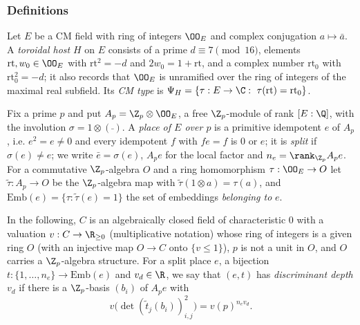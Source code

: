 \subsubsection{Definitions}
\begin{definition}\label{pf:sh-local:def:torhost}
Let $E$ be a CM field with ring of integers $\OO_E$ and complex conjugation $a\mapsto\bar a$. A \emph{toroidal host}
$H$ on $E$ consists of a prime $d\equiv7\pmod{16}$, elements $\mathrm{rt},w_0\in\OO_E$ with $\mathrm{rt}^2=-d$ and
$2w_0=1+\mathrm{rt}$, and a complex number $\mathrm{rt}_0$ with $\mathrm{rt}_0^2=-d$; it also records that $\OO_E$ is
unramified over the ring of integers of the maximal real subfield. Its \emph{CM type} is
$\Psi_H=\{\tau:E\to\C:\ \tau(\mathrm{rt})=\mathrm{rt}_0\}$.
\end{definition}

\begin{definition}\label{pf:sh-local:def:places}
Fix a prime $p$ and put $A_p=\Z_p\otimes\OO_E$, a free $\Z_p$-module of rank $[E:\Q]$, with the involution
$\sigma=1\otimes(\bar{\ })$. A \emph{place of $E$ over $p$} is a primitive idempotent $e$ of $A_p$, i.e.
$e^2=e\ne0$ and every idempotent $f$ with $fe=f$ is $0$ or $e$; it is \emph{split} if $\sigma(e)\ne e$; we write
$\bar e=\sigma(e)$, $A_pe$ for the local factor and $n_e=\rank_{\Z_p}A_pe$. For a commutative $\Z_p$-algebra $O$ and
a ring homomorphism $\tau:\OO_E\to O$ let $\tilde\tau:A_p\to O$ be the $\Z_p$-algebra map with
$\tilde\tau(1\otimes a)=\tau(a)$, and $\mathrm{Emb}(e)=\{\tau:\tilde\tau(e)=1\}$ the set of embeddings
\emph{belonging to} $e$.

In the following, $C$ is an algebraically closed field of characteristic $0$ with a valuation $v:C\to\R_{\ge0}$
(multiplicative notation) whose ring of integers is a given ring $O$ (with an injective map $O\to C$ onto
$\{v\le1\}$), $p$ is not a unit in $O$, and $O$ carries a $\Z_p$-algebra structure. For a split place $e$, a bijection
$t:\{1,\dots,n_e\}\to\mathrm{Emb}(e)$ and $v_d\in\R$, we say that $(e,t)$ has \emph{discriminant depth} $v_d$ if
there is a $\Z_p$-basis $(b_i)$ of $A_pe$ with
\[
v\bigl(\det(\tilde t_j(b_i))_{i,j}^2\bigr)=v(p)^{n_ev_d}.
\]
\end{definition}


